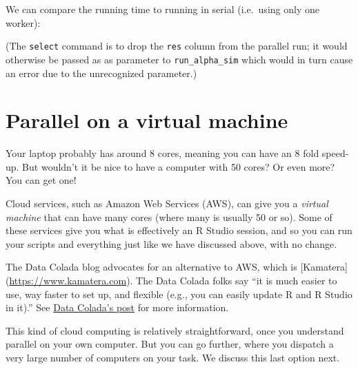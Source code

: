 \documentclass[
]{book}
\newenvironment{Shaded}{\begin{snugshade}}{\end{snugshade}}
\newcommand{\AttributeTok}[1]{\textcolor[rgb]{0.13,0.29,0.53}{#1}}
\newcommand{\FunctionTok}[1]{\textcolor[rgb]{0.13,0.29,0.53}{\textbf{#1}}}
\newcommand{\NormalTok}[1]{#1}
\newcommand{\OtherTok}[1]{\textcolor[rgb]{0.56,0.35,0.01}{#1}}
\newcommand{\SpecialCharTok}[1]{\textcolor[rgb]{0.81,0.36,0.00}{\textbf{#1}}}
\begin{document}
We can compare the running time to running in serial (i.e.~using only one worker):

\begin{Shaded}
\end{Shaded}

(The \texttt{select} command is to drop the \texttt{res} column from the parallel run; it would otherwise be passed as as parameter to \texttt{run\_alpha\_sim} which would in turn cause an error due to the unrecognized parameter.)

\section{Parallel on a virtual machine}\label{parallel-on-a-virtual-machine}

Your laptop probably has around 8 cores, meaning you can have an 8 fold speed-up.
But wouldn't it be nice to have a computer with 50 cores? Or even more?
You can get one!

Cloud services, such as Amazon Web Services (AWS), can give you a \emph{virtual machine} that can have many cores (where many is usually 50 or so).
Some of these services give you what is effectively an R Studio session, and so you can run your scripts and everything just like we have discussed above, with no change.

The Data Colada blog advocates for an alternative to AWS, which is {[}Kamatera{]} (\url{https://www.kamatera.com}).
The Data Colada folks say ``it is much easier to use, way faster to set up, and flexible (e.g., you can easily update R and R Studio in it).''
See \href{https://datacolada.org/102}{Data Colada's post} for more information.

This kind of cloud computing is relatively straightforward, once you understand parallel on your own computer.
But you can go further, where you dispatch a very large number of computers on your task.
We discuss this last option next.
\end{document}
